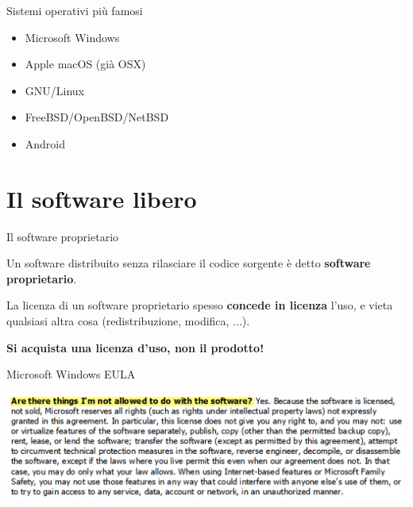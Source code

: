 \documentclass[10pt]{beamer}
\begin{document}
\begin{frame}{Sistemi operativi più famosi}

\begin{itemize}
\item Microsoft Windows
\item Apple macOS (già OSX)
\item GNU/Linux
\item FreeBSD/OpenBSD/NetBSD
\item Android
\end{itemize}

\end{frame}


\section{Il software libero}

\begin{frame}[fragile]{Il software proprietario}

Un software distribuito senza rilasciare il codice sorgente è detto \textbf{software proprietario}.

La licenza di un software proprietario spesso \textbf{concede in licenza} l'uso, e vieta qualsiasi altra cosa (redistribuzione, modifica, ...).

\textbf{Si acquista una licenza d'uso, non il prodotto!}

\end{frame}

\begin{frame}[fragile]{Microsoft Windows EULA}

\centering \includegraphics[scale=0.15]{windows_eula}

\end{frame}
\end{document}
